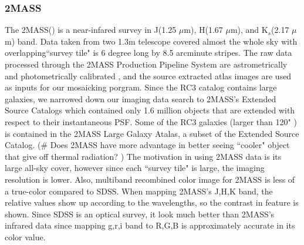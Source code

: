 \documentclass[5p]{elsarticle}
\begin{document}
	\subsubsection{2MASS}
	 The 2MASS(\citet{2mass}) is a near-infared survey in J(1.25 $\mu$m), H(1.67 $\mu$m), and K$_s$(2.17 $\mu$m) band. Data taken from two 1.3m telescope covered almost the whole sky with  overlapping``survey tile" is 6 degree long by 8.5 arcminute stripes.
 The raw data processed through the 2MASS Production Pipeline System are astrometrically and photometrically calibrated , and the source extracted atlas images are used as inputs for our mosaicking porgram. Since the RC3 catalog contains large galaxies, we narrowed down our imaging data search to  2MASS's Extended Source Catalogs which contained only 1.6 million objects that are extended with respect to their instantaneous PSF. 
Some of the RC3 galaxies (larger than 120" ) is contained in the 2MASS Large Galaxy Atalas, a subset of the Extended Source Catalog.	(\# Does 2MASS have more advantage in better seeing ``cooler" object that give off thermal radiation? ) The motivation in using 2MASS data is its large all-sky cover, however since each ``survey tile" is large, the imaging resolution is lower.  Also, multiband recombined color image for 2MASS is less of a true-color compared to SDSS. When mapping 2MASS's J,H,K band, the relative values show up according to the wavelengths, so the contrast in feature is shown. Since  SDSS is an optical survey, it look much better than 2MASS's infrared data since mapping g,r,i band to R,G,B is approximately accurate in its color value. 
\end{document}
